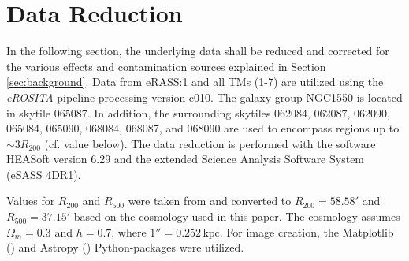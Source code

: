 
\chapter{Data Reduction}
\label{sec:data_reduction}
In the following section, the underlying data shall be reduced and corrected for the various effects and contamination sources explained in Section \ref{sec:background}. Data from eRASS:1 and all TMs (1-7) are utilized using the \textit{eROSITA} pipeline processing version c010. The galaxy group NGC1550 is located in skytile 065087. In addition, the surrounding skytiles 062084, 062087, 062090, 065084, 065090, 068084, 068087, and 068090 are used to encompass regions up to \(\sim 3R_{200}\) (cf. value below). The data reduction is performed with the software HEASoft version 6.29 and the extended Science Analysis Software System (eSASS 4DR1). 

Values for \(R_{200}\) and \(R_{500}\) were taken from \cite{Reiprich_2002} and converted to \(R_{200} = 58.58'\) and \(R_{500} = 37.15'\) based on the cosmology used in this paper. The cosmology assumes \(\Omega_m = 0.3\) and \(h = 0.7\), where \(1'' = 0.252\,\text{kpc}\). For image creation, the Matplotlib (\cite{Hunter:2007}) and Astropy (\cite{The_Astropy_Collaboration_2022}) Python-packages  were utilized.
